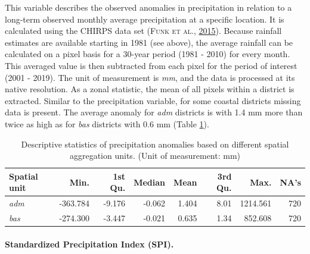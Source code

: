 \documentclass[a4paper,11pt]{article}
\begin{document}
This variable describes the observed anomalies in precipitation in relation
to a long-term observed monthly average precipitation at a specific location.
It is calculated using the CHIRPS data set \textsc{(\textnormal{\textsc{Funk} \textsc{et al.}}, \textnormal{\protect\hyperlink{ref-funk2015}{2015}})}. Because rainfall estimates
are available starting in 1981 (see above), the average rainfall can be calculated
on a pixel basis for a 30-year period (1981 - 2010) for every month. This averaged
value is then subtracted from each pixel for the period of interest (2001 - 2019).
The unit of measurement is \emph{mm}, and the data is processed at its native resolution.
As a zonal statistic, the mean of all pixels within a district is extracted.
Similar to the precipitation variable, for some coastal districts missing data
is present. The average anomaly for \emph{adm} districts is with 1.4 mm more than twice
as high as for \emph{bas} districts with 0.6 mm (Table \ref{tab:02-data-anom}).
\begin{table}[H]

\caption[Descriptive statistics of precipitation anomalies.]{\label{tab:02-data-anom}Descriptive statistics of precipitation anomalies based on different spatial
               aggregation units. (Unit of measurement: mm)}
\centering
\fontsize{10}{12}\selectfont
\begin{tabular}[t]{lrrrrrrr}
\toprule
Spatial unit & Min. & 1st Qu. & Median & Mean & 3rd Qu. & Max. & NA's\\
\midrule
\textit{adm} & -363.784 & -9.176 & -0.062 & 1.404 & 8.01 & 1214.561 & 720\\
\textit{bas} & -274.300 & -3.447 & -0.021 & 0.635 & 1.34 & 852.608 & 720\\
\bottomrule
\end{tabular}
\end{table}
\hypertarget{standardized-precipitation-index-spi.}{%
\paragraph{Standardized Precipitation Index (SPI).}\label{standardized-precipitation-index-spi.}}
\end{document}
